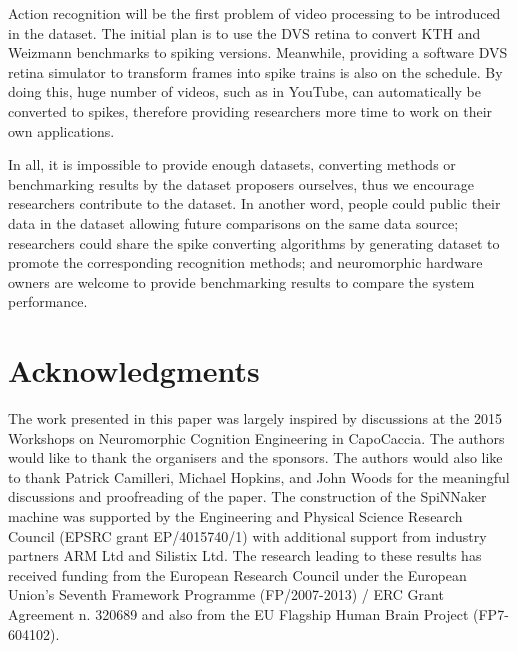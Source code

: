 \documentclass{frontiersENG} %
\begin{document}
Action recognition will be the first problem of video processing to be introduced in the dataset.
The initial plan is to use the DVS retina to convert KTH and Weizmann benchmarks to spiking versions.
Meanwhile, providing a software DVS retina simulator to transform  frames into spike trains is also on the schedule.
By doing this, huge number of videos, such as in YouTube, can automatically be converted to spikes, therefore providing researchers more time to work on their own applications.

In all, it is impossible to provide enough datasets, converting methods or benchmarking results by the dataset proposers ourselves, thus we encourage researchers contribute to the dataset.
In another word, people could public their data in the dataset allowing future comparisons on the same data source;
researchers could share the spike converting algorithms by generating dataset to promote the corresponding recognition methods;
and neuromorphic hardware owners are welcome to provide benchmarking results to compare the system performance.

\section*{Acknowledgments}

The work presented in this paper was largely inspired by discussions at the 2015 Workshops on Neuromorphic Cognition Engineering in CapoCaccia.
The authors would like to thank the organisers and the sponsors.
The authors would also like to thank Patrick Camilleri, Michael Hopkins, and John Woods for the meaningful discussions and proofreading of the paper.
The construction of the SpiNNaker machine was supported by the Engineering and Physical Science Research Council (EPSRC grant EP/4015740/1) with additional support from industry partners ARM Ltd and Silistix Ltd.
The research leading to these results has received funding from the European Research Council under the European Union's Seventh Framework Programme (FP/2007-2013) / ERC Grant Agreement n. 320689 and also from the EU Flagship Human Brain Project (FP7-604102). 



%
\end{document}
